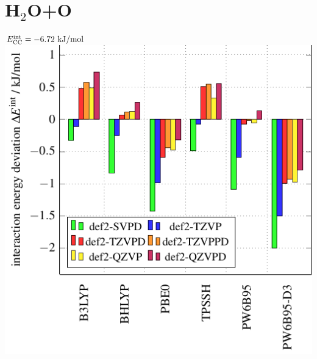 \documentclass{article}
\newcommand\eint{\enmat{E^{\te{int}}}}
\newcommand\ecc{\enmat{\eint_{\te {CC}}}}
\newcommand\kmo{\enmat{\te {kJ/mol}}}
\begin{document}
\section*{H$_2$O+O}
\large$\ecc=-6.72\ \kmo$ \\
\includegraphics[width=.48\textwidth]{H2O+O+FuncCompare.pdf}
%
%
%
\end{document}
